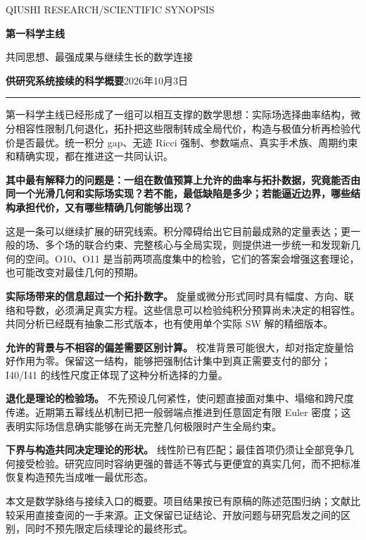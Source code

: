 \documentclass[11pt,a4paper]{article}
\newcommand{\key}[1]{\textbf{\color{ink}#1}}
\newcommand{\subhead}[1]{\par\medskip{\sffamily\bfseries\color{ink}#1}\par}
\begin{document}
\thispagestyle{empty}
{\sffamily\color{muted}\small QIUSHI RESEARCH\quad /\quad SCIENTIFIC SYNOPSIS}
\vspace{7mm}

{\sffamily\bfseries\color{ink}\LARGE 第一科学主线}

{\sffamily\Large 共同思想、最强成果与继续生长的数学连接}

\vspace{3mm}
\key{供研究系统接续的科学概要}\hfill 2026年10月3日

\vspace{3mm}\hrule\vspace{3mm}

第一科学主线已经形成了一组可以相互支撑的数学思想：实际场选择曲率结构，微分相容性限制几何退化，拓扑把这些限制转成全局代价，构造与极值分析再检验代价是否最优。统一积分 gap、无迹 Ricci 强制、参数端点、真实手术族、周期约束和精确实现，都在推进这一共同认识。

\key{其中最有解释力的问题是：一组在数值预算上允许的曲率与拓扑数据，究竟能否由同一个光滑几何和实际场实现？若不能，最低缺陷是多少；若能逼近边界，哪些结构承担代价，又有哪些精确几何能够出现？}

这是一条可以继续扩展的研究线索。积分障碍给出它目前最成熟的定量表达；更一般的场、多个场的联合约束、完整核心与全局实现，则提供进一步统一和发现新几何的空间。O10、O11 是当前两项高度集中的检验，它们的答案会增强这套理论，也可能改变对最佳几何的预期。

\subhead{当前最值得保存的整体认识}

\textbf{实际场带来的信息超过一个拓扑数字。} 旋量或微分形式同时具有幅度、方向、联络和导数，必须满足真实方程。这些信息可以检验纯积分预算尚未决定的相容性。共同分析已经既有抽象二形式版本，也有使用单个实际 SW 解的精细版本。

\textbf{允许的背景与不相容的偏差需要区别计算。} 校准背景可能很大，却对指定旋量恰好作用为零。保留这一结构，能够把强制估计集中到真正需要支付的部分；I40/I41 的线性尺度正体现了这种分析选择的力量。

\textbf{退化是理论的检验场。} 不先预设几何紧性，使问题直接面对集中、塌缩和跨尺度传递。近期第五幂线丛机制已把一般弱端点推进到任意固定有限 Euler 密度；这表明实际场信息确实能够在尚无完整几何极限时产生全局约束。

\textbf{下界与构造共同决定理论的形状。} 线性阶已有匹配；最佳首项仍须让全部竞争几何接受检验。研究应同时容纳更强的普适不等式与更便宜的真实几何，而不把标准恢复构造预先当成唯一最优形态。

\vfill
{\small\color{muted}本文是数学脉络与接续入口的概要。项目结果按已有原稿的陈述范围归纳；文献比较采用直接查阅的一手来源。正文保留已证结论、开放问题与研究启发之间的区别，同时不预先限定后续理论的最终形式。}
\end{document}
